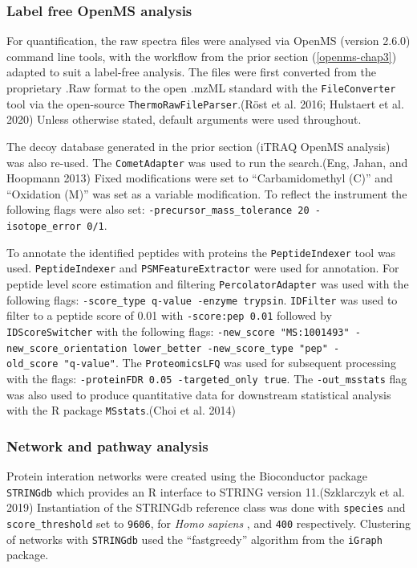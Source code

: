 \documentclass[9pt,lineno]{elife}
\begin{document}
\hypertarget{openms-label-free}{%
\subsubsection{Label free OpenMS analysis}\label{openms-label-free}}

For quantification, the raw spectra files were analysed via OpenMS (version 2.6.0) command line tools, with the workflow from the prior section (\ref{openms-chap3}) adapted to suit a label-free analysis.
The files were first converted from the proprietary .Raw format to the open .mzML standard with the \texttt{FileConverter} tool via the open-source \texttt{ThermoRawFileParser}.(Röst et al. 2016; Hulstaert et al. 2020) Unless otherwise stated, default arguments were used throughout.

The decoy database generated in the prior section (iTRAQ OpenMS analysis) was also re-used.
The \texttt{CometAdapter} was used to run the search.(Eng, Jahan, and Hoopmann 2013) Fixed modifications were set to ``Carbamidomethyl (C)'' and ``Oxidation (M)'' was set as a variable modification.
To reflect the instrument the following flags were also set: \texttt{-precursor\_mass\_tolerance\ 20\ -isotope\_error\ 0/1}.

To annotate the identified peptides with proteins the \texttt{PeptideIndexer} tool was used.
\texttt{PeptideIndexer} and \texttt{PSMFeatureExtractor} were used for annotation.
For peptide level score estimation and filtering \texttt{PercolatorAdapter} was used with the following flags: \texttt{-score\_type\ q-value\ -enzyme\ trypsin}.
\texttt{IDFilter} was used to filter to a peptide score of 0.01 with \texttt{-score:pep\ 0.01} followed by \texttt{IDScoreSwitcher} with the following flags: \texttt{-new\_score\ "MS:1001493"\ -new\_score\_orientation\ lower\_better\ -new\_score\_type\ "pep"\ -old\_score\ "q-value"}.
The \texttt{ProteomicsLFQ} was used for subsequent processing with the flags: \texttt{-proteinFDR\ 0.05\ -targeted\_only\ true}.
The \texttt{-out\_msstats} flag was also used to produce quantitative data for downstream statistical analysis with the R package \texttt{MSstats}.(Choi et al. 2014)

\hypertarget{pathway-analysis-chap3}{%
\subsubsection{Network and pathway analysis}\label{pathway-analysis-chap3}}

Protein interation networks were created using the Bioconductor package \texttt{STRINGdb} which provides an R interface to STRING version 11.(Szklarczyk et al. 2019) Instantiation of the STRINGdb reference class was done with \texttt{species} and \texttt{score\_threshold} set to \texttt{9606}, for \emph{Homo sapiens} , and \texttt{400} respectively.
Clustering of networks with \texttt{STRINGdb} used the ``fastgreedy'' algorithm from the \texttt{iGraph} package.
\end{document}
